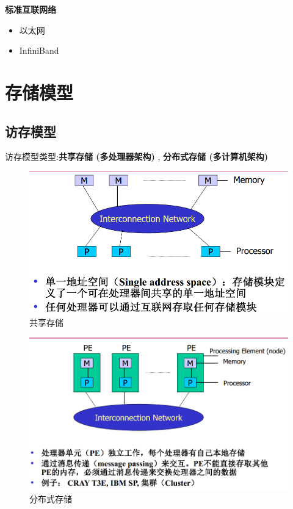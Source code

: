 \documentclass[UTF8,a4paper]{ctexart}
\newcommand{\spaceline}{\vspace{\baselineskip}}
\begin{document}
  \spaceline
  \textbf{标准互联网络}
  \begin{itemize}
    \item 以太网
    \item InfiniBand
  \end{itemize}

  \section{存储模型}
  \subsection{访存模型}
  访存模型类型:\textbf{共享存储 (多处理器架构)} , \textbf{分布式存储 (多计算机架构)}

  \begin{figure}[H]
    \centering
    \includegraphics[scale = 0.3]{assets/ParallelComputing_b2071.png}
    \caption{共享存储}
  \end{figure}

  \begin{figure}[H]
    \centering
    \includegraphics[scale = 0.3]{assets/ParallelComputing_ed9df.png}
    \caption{分布式存储}
  \end{figure}
\end{document}
